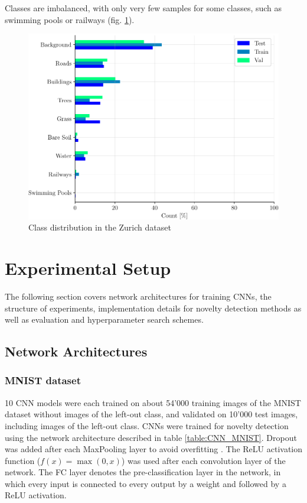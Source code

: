 \documentclass[10pt]{article}
\begin{document}
Classes are imbalanced, with only very few samples for some classes, such as swimming pools or railways (fig. \ref{fig:zurich-label-dist}).

\begin{figure}[H]
    \centering
    \includegraphics[width=.7\textwidth]{ZH_dist}
    \caption{Class distribution in the Zurich dataset}
    \label{fig:zurich-label-dist}
\end{figure}


\section{Experimental Setup}
\label{sec:experimental-setup}
The following section covers network architectures for training \glspl{CNN}, the structure of experiments, implementation details for novelty detection methods as well as evaluation and hyperparameter search schemes.

\subsection{Network Architectures}
\label{sec:network-architectures}
\subsubsection{MNIST dataset} 
10 \gls{CNN} models were each trained on about 54'000 training images of the \gls{MNIST} dataset without images of the left-out class, and validated on 10'000 test images, including images of the left-out class. \glspl{CNN} were trained for novelty detection using the network architecture described in table \ref{table:CNN_MNIST}. Dropout was added after each MaxPooling layer to avoid overfitting \cite{Srivastava2014DropoutAS}. The \gls{ReLU} activation function ($f(x) = \max(0, x)$) was used after each convolution layer of the network.  The \gls{FC} layer denotes the pre-classification layer in the network, in which every input is connected to every output by a weight and followed by a \gls{ReLU} activation.
\end{document}

